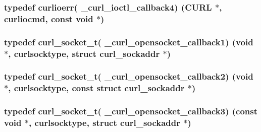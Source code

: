 \subsubsection[{\texorpdfstring{\+\_\+curl\+\_\+ioctl\+\_\+callback4}{_curl_ioctl_callback4}}]{\setlength{\rightskip}{0pt plus 5cm}typedef {\bf curlioerr}( \+\_\+curl\+\_\+ioctl\+\_\+callback4) ({\bf C\+U\+RL} $\ast$, {\bf curliocmd}, const void $\ast$)}\hypertarget{typecheck-gcc_8h_ab1a3806b61adfbc7040daf6f6d115f02}{}\label{typecheck-gcc_8h_ab1a3806b61adfbc7040daf6f6d115f02}
\subsubsection[{\texorpdfstring{\+\_\+curl\+\_\+opensocket\+\_\+callback1}{_curl_opensocket_callback1}}]{\setlength{\rightskip}{0pt plus 5cm}typedef {\bf curl\+\_\+socket\+\_\+t}( \+\_\+curl\+\_\+opensocket\+\_\+callback1) (void $\ast$, {\bf curlsocktype}, struct {\bf curl\+\_\+sockaddr} $\ast$)}\hypertarget{typecheck-gcc_8h_a3e4f955d1af288f560f2cad5991caa14}{}\label{typecheck-gcc_8h_a3e4f955d1af288f560f2cad5991caa14}
\subsubsection[{\texorpdfstring{\+\_\+curl\+\_\+opensocket\+\_\+callback2}{_curl_opensocket_callback2}}]{\setlength{\rightskip}{0pt plus 5cm}typedef {\bf curl\+\_\+socket\+\_\+t}( \+\_\+curl\+\_\+opensocket\+\_\+callback2) (void $\ast$, {\bf curlsocktype}, const struct {\bf curl\+\_\+sockaddr} $\ast$)}\hypertarget{typecheck-gcc_8h_a94ad8a966561cb2d8182d913924ea3d4}{}\label{typecheck-gcc_8h_a94ad8a966561cb2d8182d913924ea3d4}
\subsubsection[{\texorpdfstring{\+\_\+curl\+\_\+opensocket\+\_\+callback3}{_curl_opensocket_callback3}}]{\setlength{\rightskip}{0pt plus 5cm}typedef {\bf curl\+\_\+socket\+\_\+t}( \+\_\+curl\+\_\+opensocket\+\_\+callback3) (const void $\ast$, {\bf curlsocktype}, struct {\bf curl\+\_\+sockaddr} $\ast$)}\hypertarget{typecheck-gcc_8h_a41d3335c85e3e2708a787de313b41735}{}\label{typecheck-gcc_8h_a41d3335c85e3e2708a787de313b41735}
